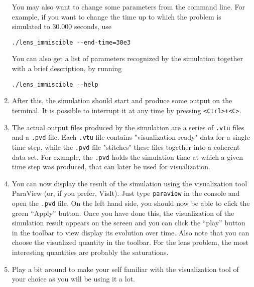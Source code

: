 \begin{enumerate}
You may also want to change some parameters from the command line. For
example, if you want to change the time up to which the problem is
simulated to $30.000$ seconds, use
\begin{lstlisting}[style=Bash]
./lens_immiscible --end-time=30e3
\end{lstlisting}

You can also get a list of parameters recognized by the
simulation together with a brief description, by running
\begin{lstlisting}[style=Bash]
./lens_immiscible --help
\end{lstlisting}

\item After this, the simulation should start and produce some output
  on the terminal. It is possible to interrupt it at any time by
  pressing \texttt{<Ctrl>+<C>}.

\item The actual output files produced by the simulation are a series
  of \texttt{.vtu} files and a \texttt{.pvd} file. Each \texttt{.vtu}
  file contains "visualization ready" data for a single time step,
  while the \texttt{.pvd} file "stitches" these files together into a
  coherent data set. For example, the \texttt{.pvd} holds the
  simulation time at which a given time step was produced, that can
  later be used for visualization.
\item You can now display the result of the simulation using the
  visualization tool ParaView (or, if you prefer, VisIt). Just type
  \texttt{paraview} in the console and open the \texttt{.pvd} file. On
  the left hand side, you should now be able to click the green
  ``Apply'' button. Once you have done this, the visualization of the
  simulation result appears on the screen and you can click the
  ``play'' button in the toolbar to view display its evolution over
  time.  Also note that you can choose the visualized quantity
  in the toolbar. For the lens problem, the most interesting quantities
  are probably the saturations.
\item Play a bit around to make your self familiar with the
  visualization tool of your choice as you will be using it a lot.
\end{enumerate}

